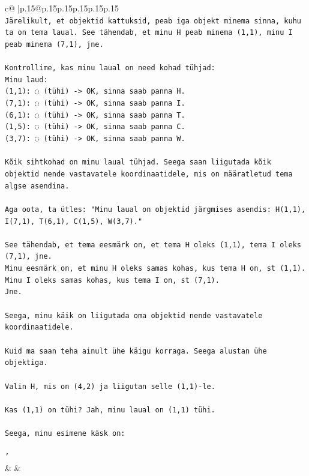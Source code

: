 \documentclass{article}
\begin{document}
{\begin{supertabular}{c@{$\;$}|p{.15\linewidth}@{}p{.15\linewidth}p{.15\linewidth}p{.15\linewidth}p{.15\linewidth}p{.15\linewidth}}
{{{\\ 
\texttt{Järelikult, et objektid kattuksid, peab iga objekt minema sinna, kuhu ta on tema laual. See tähendab, et minu H peab minema (1,1), minu I peab minema (7,1), jne.} \\
\\ 
\texttt{Kontrollime, kas minu laual on need kohad tühjad:} \\
\texttt{Minu laud:} \\
\texttt{(1,1): ◌ (tühi) {-}> OK, sinna saab panna H.} \\
\texttt{(7,1): ◌ (tühi) {-}> OK, sinna saab panna I.} \\
\texttt{(6,1): ◌ (tühi) {-}> OK, sinna saab panna T.} \\
\texttt{(1,5): ◌ (tühi) {-}> OK, sinna saab panna C.} \\
\texttt{(3,7): ◌ (tühi) {-}> OK, sinna saab panna W.} \\
\\ 
\texttt{Kõik sihtkohad on minu laual tühjad. Seega saan liigutada kõik objektid nende vastavatele koordinaatidele, mis on määratletud tema algse asendina.} \\
\\ 
\texttt{Aga oota, ta ütles: "Minu laual on objektid järgmises asendis: H(1,1), I(7,1), T(6,1), C(1,5), W(3,7)."} \\
\\ 
\texttt{See tähendab, et tema eesmärk on, et tema H oleks (1,1), tema I oleks (7,1), jne.} \\
\texttt{Minu eesmärk on, et minu H oleks samas kohas, kus tema H on, st (1,1).} \\
\texttt{Minu I oleks samas kohas, kus tema I on, st (7,1).} \\
\texttt{Jne.} \\
\\ 
\texttt{Seega, minu käik on liigutada oma objektid nende vastavatele koordinaatidele.} \\
\\ 
\texttt{Kuid ma saan teha ainult ühe käigu korraga. Seega alustan ühe objektiga.} \\
\\ 
\texttt{Valin H, mis on (4,2) ja liigutan selle (1,1){-}le.} \\
\\ 
\texttt{Kas (1,1) on tühi? Jah, minu laual on (1,1) tühi.} \\
\\ 
\texttt{Seega, minu esimene käsk on:} \\
\\ 
\texttt{'} \\
            }
        }
    }
    & & \\ \\


\end{supertabular}}
\end{document}

